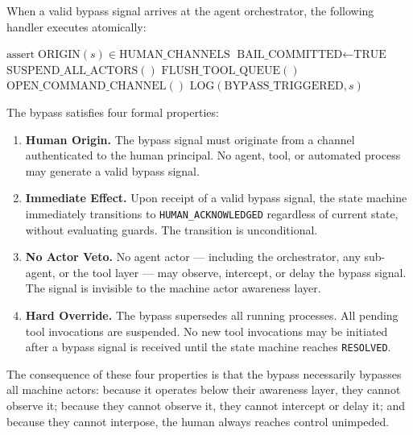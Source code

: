 When a valid bypass signal arrives at the agent orchestrator, the following handler executes atomically:

\bigskip

\begin{algorithm}
\caption{Bypass Handler}
\label{alg:bypass}
\begin{algorithmic}[1]
    \State $\text{assert} \; \text{ORIGIN}(s) \in \text{HUMAN\_CHANNELS}$
    \State $\text{BAIL\_COMMITTED} \gets \text{TRUE}$ 
    \State $\text{SUSPEND\_ALL\_ACTORS}()$
    \State $\text{FLUSH\_TOOL\_QUEUE}()$
    \State $\text{OPEN\_COMMAND\_CHANNEL}()$
    \State $\text{LOG}(\text{BYPASS\_TRIGGERED}, s)$
    \State \Return {}
\EndFunction
\end{algorithmic}
\end{algorithm}

\bigskip

The bypass satisfies four formal properties:

\begin{enumerate}
  \item \textbf{Human Origin.} The bypass signal must originate from a channel authenticated to the human principal. No agent, tool, or automated process may generate a valid bypass signal.
  \item \textbf{Immediate Effect.} Upon receipt of a valid bypass signal, the state machine immediately transitions to \texttt{HUMAN\_ACKNOWLEDGED} regardless of current state, without evaluating guards. The transition is unconditional.
  \item \textbf{No Actor Veto.} No agent actor — including the orchestrator, any sub-agent, or the tool layer — may observe, intercept, or delay the bypass signal. The signal is invisible to the machine actor awareness layer.
  \item \textbf{Hard Override.} The bypass supersedes all running processes. All pending tool invocations are suspended. No new tool invocations may be initiated after a bypass signal is received until the state machine reaches \texttt{RESOLVED}.
\end{enumerate}

The consequence of these four properties is that the bypass necessarily bypasses all machine actors: because it operates below their awareness layer, they cannot observe it; because they cannot observe it, they cannot intercept or delay it; and because they cannot interpose, the human always reaches control unimpeded.


